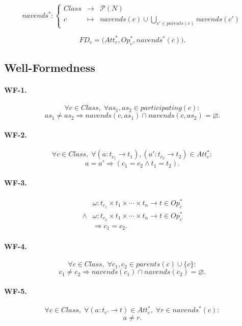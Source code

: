 \documentclass[12pt,a4paper]{article}
\theoremstyle{definition}
\begin{document}
\[
navends^{*}:
\left\{
\begin{array}{rcl}
Class & \to & \mathcal{P}(N)\\
c & \mapsto &
navends(c)
\cup
\displaystyle\bigcup_{c'\in parents(c)}navends(c')
\end{array}
\right.
\]

\[
FD_c
=
\bigl(
Att_c^{*},
Op_c^{*},
navends^{*}(c)
\bigr).
\]


\subsection{Well-Formedness}

\paragraph{WF-1.}
\[
\forall c\in Class,\;
\forall as_1,as_2\in participating(c):
\]
\[
as_1\neq as_2
\Rightarrow
navends(c,as_1)\cap navends(c,as_2)=\varnothing.
\tag{WF-1}
\]


\paragraph{WF-2.}
\[
\forall c\in Class,\;
\forall
(a:t_{c_1}\to t_1),
(a':t_{c_2}\to t_2)
\in Att_c^{*}:
\]
\[
a=a'
\Rightarrow
(c_1=c_2\land t_1=t_2).
\tag{WF-2}
\]


\paragraph{WF-3.}
\[
\begin{aligned}
&
\omega:t_{c_1}\times t_1\times\cdots\times t_n\to t
\in Op_c^{*}
\\
{}\land{}&
\omega:t_{c_2}\times t_1\times\cdots\times t_n\to t
\in Op_c^{*}
\\
&\Rightarrow c_1=c_2.
\end{aligned}
\tag{WF-3}
\]


\paragraph{WF-4.}
\[
\forall c\in Class,\;
\forall c_1,c_2\in parents(c)\cup\{c\}:
\]
\[
c_1\neq c_2
\Rightarrow
navends(c_1)\cap navends(c_2)=\varnothing.
\tag{WF-4}
\]


\paragraph{WF-5.}
\[
\forall c\in Class,\;
\forall(a:t_{c'}\to t)\in Att_c^{*},\;
\forall r\in navends^{*}(c):
\]
\[
a\neq r.
\tag{WF-5}
\]
\end{document}
